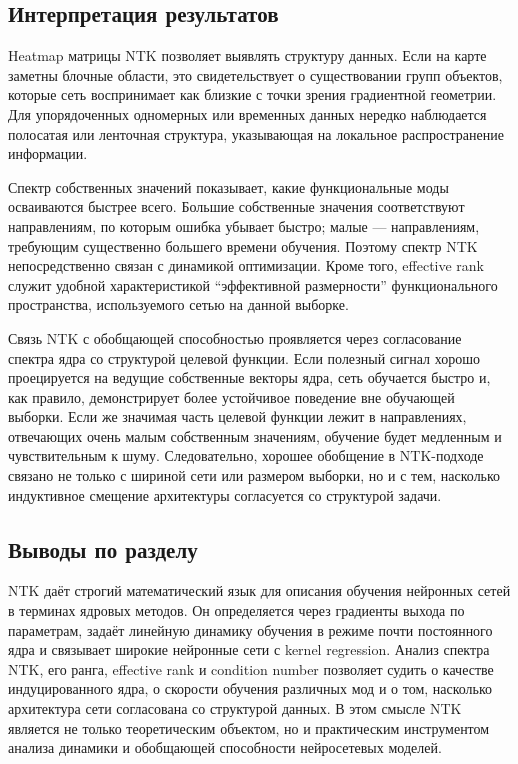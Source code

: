 \subsection{Интерпретация результатов}

Heatmap матрицы NTK позволяет выявлять структуру данных. Если на карте заметны блочные области, это свидетельствует о существовании групп объектов, которые сеть воспринимает как близкие с точки зрения градиентной геометрии. Для упорядоченных одномерных или временных данных нередко наблюдается полосатая или ленточная структура, указывающая на локальное распространение информации.

Спектр собственных значений показывает, какие функциональные моды осваиваются быстрее всего. Большие собственные значения соответствуют направлениям, по которым ошибка убывает быстро; малые --- направлениям, требующим существенно большего времени обучения. Поэтому спектр NTK непосредственно связан с динамикой оптимизации. Кроме того, effective rank служит удобной характеристикой ``эффективной размерности'' функционального пространства, используемого сетью на данной выборке.

Связь NTK с обобщающей способностью проявляется через согласование спектра ядра со структурой целевой функции. Если полезный сигнал хорошо проецируется на ведущие собственные векторы ядра, сеть обучается быстро и, как правило, демонстрирует более устойчивое поведение вне обучающей выборки. Если же значимая часть целевой функции лежит в направлениях, отвечающих очень малым собственным значениям, обучение будет медленным и чувствительным к шуму. Следовательно, хорошее обобщение в NTK-подходе связано не только с шириной сети или размером выборки, но и с тем, насколько индуктивное смещение архитектуры согласуется со структурой задачи.

\subsection{Выводы по разделу}

NTK даёт строгий математический язык для описания обучения нейронных сетей в терминах ядровых методов. Он определяется через градиенты выхода по параметрам, задаёт линейную динамику обучения в режиме почти постоянного ядра и связывает широкие нейронные сети с kernel regression. Анализ спектра NTK, его ранга, effective rank и condition number позволяет судить о качестве индуцированного ядра, о скорости обучения различных мод и о том, насколько архитектура сети согласована со структурой данных. В этом смысле NTK является не только теоретическим объектом, но и практическим инструментом анализа динамики и обобщающей способности нейросетевых моделей.

